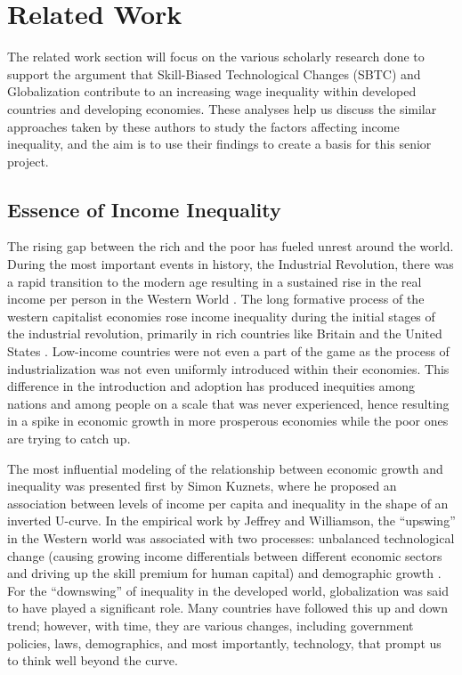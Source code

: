 \chapter{Related Work} 
\label{ch:relatedwork}

\hspace{20pt}The related work section will focus on the various scholarly research done to support the argument that Skill-Biased Technological Changes (SBTC) and Globalization contribute to an increasing wage inequality within developed countries and developing economies. These analyses help us discuss the similar approaches taken by these authors to study the factors affecting income inequality, and the aim is to use their findings to create a basis for this senior project.

\label{sec:relatedwork}
\section{Essence of Income Inequality}

\hspace{20pt}The rising gap between the rich and the poor has fueled unrest around the world. During the most important events in history, the Industrial Revolution, there was a rapid transition to the modern age resulting in a sustained rise in the real income per person in the Western World \cite{nardinelli}. The long formative process of the western capitalist economies rose income inequality during the initial stages of the industrial revolution, primarily in rich countries like Britain and the United States \cite{ryckbosch2016economic}. Low-income countries were not even a part of the game as the process of industrialization was not even uniformly introduced within their economies. This difference in the introduction and adoption has produced inequities among nations and among people on a scale that was never experienced, hence resulting in a spike in economic growth in more prosperous economies while the poor ones are trying to catch up.


The most influential modeling of the relationship between economic growth and inequality was presented first by Simon Kuznets, where he proposed an association between levels of income per capita and inequality in the shape of an inverted U-curve. In the empirical work by Jeffrey and Williamson, the “upswing” in the Western world was associated with two processes: unbalanced technological change (causing growing income differentials between different economic sectors and driving up the skill premium for human capital) and demographic growth \cite{korzeniewicz2005theorizing}. For the “downswing” of inequality in the developed world, globalization was said to have played a significant role. Many countries have followed this up and down trend; however, with time, they are various changes, including government policies, laws, demographics, and most importantly, technology, that prompt us to think well beyond the curve.


